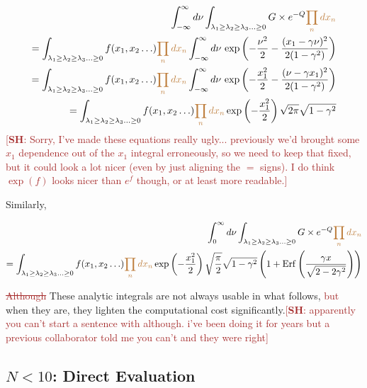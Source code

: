 \documentclass[12pt]{article}
\newcommand{\SH}[1]{\textcolor{brown}{[{\bf SH}: #1]}}
\newcommand{\sh}[1]{\textcolor{brown}{#1}}
\begin{document}
\begin{equation}
\begin{split}
\int^\infty_{-\infty} d\nu \int_{\lambda_1 \geq \lambda_2 \geq \lambda_3 \ldots \geq 0} G \times e^{-Q} \sh{\prod_n dx_n} \\ 
=  \int_{\lambda_1 \geq \lambda_2 \geq \lambda_3 \ldots \geq 0} f(x_1, x_2 \ldots) \sh{\prod_n dx_n} \int^\infty_{-\infty} d\nu \,\exp\left(-\frac{\nu^2}{2}- \frac{(x_1- \gamma \nu)^2}{2(1-\gamma^2)}\right)\\
= \int_{\lambda_1 \geq \lambda_2 \geq \lambda_3 \ldots \geq 0} f(x_1, x_2 \ldots)  \sh{\prod_n dx_n}\int^\infty_{-\infty} d\nu \,\exp\left(-\frac{x_1^2}{2}- \frac{(\nu - \gamma x_1)^2}{2(1-\gamma^2)}\right)\\
= \int_{\lambda_1 \geq \lambda_2 \geq \lambda_3 \ldots \geq 0} f(x_1, x_2 \ldots) \sh{\prod_n dx_n}\exp\left(-\frac{x_1^2}{2}\right) \sqrt{2\pi}\sqrt{1-\gamma^2}\\
\end{split}
\end{equation}
\SH{Sorry, I've made these equations really ugly... previously we'd brought some $x_1$ dependence  out of the $x_1$ integral erroneously, so we need to keep that fixed, but it could look a lot nicer (even by just aligning the $=$ signs). I do think $\exp(f)$ looks nicer than $e^{f}$ though, or at least more readable.}

Similarly, 

\begin{equation}
\begin{split}
\int^\infty_0 d\nu \int_{\lambda_1 \geq \lambda_2 \geq \lambda_3 \ldots \geq 0} G \times e^{-Q} \sh{\prod_n dx_n}\\ 
= \int_{\lambda_1 \geq \lambda_2 \geq \lambda_3 \ldots \geq 0} f(x_1, x_2 \ldots) \sh{\prod_n dx_n}\exp\left(-\frac{x_1^2}{2}\right) \sqrt{\frac{\pi}{2}}\sqrt{1-\gamma^2} \left(1+\mathrm{Erf}\left(\frac{\gamma x}{\sqrt{2-2\gamma^2}}\right)\right)\\
\end{split}
\end{equation}

\sh{\sout{Although}} These analytic integrals are not always usable in what follows, \sh{but} when they are, they lighten the computational cost significantly.\SH{apparently you can't start a sentence with although. i've been doing it for years but a previous collaborator told me you can't and they were right}

\subsection{$N < 10$: Direct Evaluation  }
\end{document}
